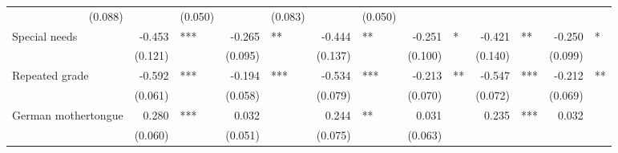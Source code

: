 \documentclass{article}
\begin{document}
\begin{table}[!h]
\begin{tabular}{lllllllllllll}
  \multicolumn{1}{r}{(0.088)} &
  \multicolumn{1}{l}{} &
  \multicolumn{1}{r}{(0.050)} &
  \multicolumn{1}{l}{} &
  \multicolumn{1}{r}{(0.083)} &
  \multicolumn{1}{l}{} &
  \multicolumn{1}{r}{(0.050)} &
  \multicolumn{1}{l}{} \\
\multicolumn{1}{l}{Special needs} &
  \multicolumn{1}{r}{-0.453} &
  \multicolumn{1}{l}{***} &
  \multicolumn{1}{r}{-0.265} &
  \multicolumn{1}{l}{**} &
  \multicolumn{1}{r}{-0.444} &
  \multicolumn{1}{l}{**} &
  \multicolumn{1}{r}{-0.251} &
  \multicolumn{1}{l}{*} &
  \multicolumn{1}{r}{-0.421} &
  \multicolumn{1}{l}{**} &
  \multicolumn{1}{r}{-0.250} &
  \multicolumn{1}{l}{*} \\
\multicolumn{1}{l}{} &
  \multicolumn{1}{r}{(0.121)} &
  \multicolumn{1}{l}{} &
  \multicolumn{1}{r}{(0.095)} &
  \multicolumn{1}{l}{} &
  \multicolumn{1}{r}{(0.137)} &
  \multicolumn{1}{l}{} &
  \multicolumn{1}{r}{(0.100)} &
  \multicolumn{1}{l}{} &
  \multicolumn{1}{r}{(0.140)} &
  \multicolumn{1}{l}{} &
  \multicolumn{1}{r}{(0.099)} &
  \multicolumn{1}{l}{} \\
\multicolumn{1}{l}{Repeated grade} &
  \multicolumn{1}{r}{-0.592} &
  \multicolumn{1}{l}{***} &
  \multicolumn{1}{r}{-0.194} &
  \multicolumn{1}{l}{***} &
  \multicolumn{1}{r}{-0.534} &
  \multicolumn{1}{l}{***} &
  \multicolumn{1}{r}{-0.213} &
  \multicolumn{1}{l}{**} &
  \multicolumn{1}{r}{-0.547} &
  \multicolumn{1}{l}{***} &
  \multicolumn{1}{r}{-0.212} &
  \multicolumn{1}{l}{**} \\
\multicolumn{1}{l}{} &
  \multicolumn{1}{r}{(0.061)} &
  \multicolumn{1}{l}{} &
  \multicolumn{1}{r}{(0.058)} &
  \multicolumn{1}{l}{} &
  \multicolumn{1}{r}{(0.079)} &
  \multicolumn{1}{l}{} &
  \multicolumn{1}{r}{(0.070)} &
  \multicolumn{1}{l}{} &
  \multicolumn{1}{r}{(0.072)} &
  \multicolumn{1}{l}{} &
  \multicolumn{1}{r}{(0.069)} &
  \multicolumn{1}{l}{} \\
\multicolumn{1}{l}{German mothertongue} &
  \multicolumn{1}{r}{0.280} &
  \multicolumn{1}{l}{***} &
  \multicolumn{1}{r}{0.032} &
  \multicolumn{1}{l}{} &
  \multicolumn{1}{r}{0.244} &
  \multicolumn{1}{l}{**} &
  \multicolumn{1}{r}{0.031} &
  \multicolumn{1}{l}{} &
  \multicolumn{1}{r}{0.235} &
  \multicolumn{1}{l}{***} &
  \multicolumn{1}{r}{0.032} &
  \multicolumn{1}{l}{} \\
\multicolumn{1}{l}{} &
  \multicolumn{1}{r}{(0.060)} &
  \multicolumn{1}{l}{} &
  \multicolumn{1}{r}{(0.051)} &
  \multicolumn{1}{l}{} &
  \multicolumn{1}{r}{(0.075)} &
  \multicolumn{1}{l}{} &
  \multicolumn{1}{r}{(0.063)} &
  \multicolumn{1}{l}{} &

\end{tabular}
\end{table}
\end{document}
